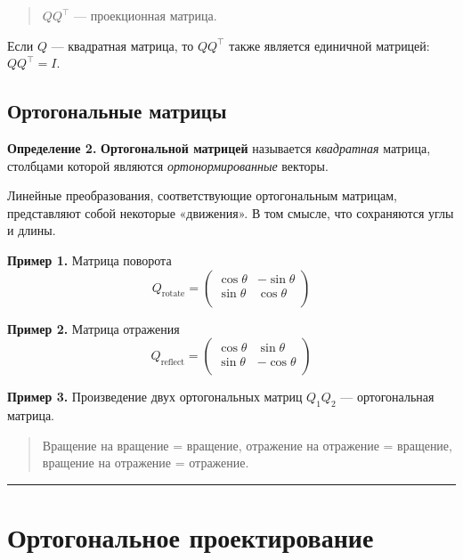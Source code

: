 \documentclass[11pt,a4paper]{article}
\begin{document}
\begin{quote}
\(QQ^\top\) --- проекционная матрица.
\end{quote}

Если \(Q\) --- квадратная матрица, то \(Q Q^\top\) также является
единичной матрицей: \(Q Q^\top = I\).

    \hypertarget{ux43eux440ux442ux43eux433ux43eux43dux430ux43bux44cux43dux44bux435-ux432ux435ux43aux442ux43eux440ux44b-ux438-ux43cux430ux442ux440ux438ux446ux44b}{%
\subsection{Ортогональные
матрицы}\label{ux43eux440ux442ux43eux433ux43eux43dux430ux43bux44cux43dux44bux435-ux432ux435ux43aux442ux43eux440ux44b-ux438-ux43cux430ux442ux440ux438ux446ux44b}}

\textbf{Определение 2.} \textbf{Ортогональной матрицей} называется
\emph{квадратная} матрица, столбцами которой являются \emph{ортонормированные}
векторы.

Линейные преобразования, соответствующие ортогональным матрицам,
представляют собой некоторые «движения». В том смысле, что сохраняются
углы и длины.

\textbf{Пример 1.} Матрица поворота \[
  Q_\mathrm{rotate} =
  \begin{pmatrix}
     \cos\theta & -\sin\theta \\
     \sin\theta &  \cos\theta \\
  \end{pmatrix}
\]

\textbf{Пример 2.} Матрица отражения \[
  Q_\mathrm{reflect} =
  \begin{pmatrix}
     \cos\theta &  \sin\theta \\
     \sin\theta & -\cos\theta \\
  \end{pmatrix}
\]

\textbf{Пример 3.} Произведение двух ортогональных матриц \(Q_1 Q_2\)
--- ортогональная матрица.

\begin{quote}
Вращение на вращение = вращение, отражение на отражение = вращение,
вращение на отражение = отражение.
\end{quote}

    \begin{center}\rule{0.5\linewidth}{0.5pt}\end{center}

    \hypertarget{ux43eux440ux442ux43eux433ux43eux43dux430ux43bux44cux43dux43eux435-ux43fux440ux43eux435ux43aux442ux438ux440ux43eux432ux430ux43dux438ux435}{%
\section{Ортогональное
проектирование}\label{ux43eux440ux442ux43eux433ux43eux43dux430ux43bux44cux43dux43eux435-ux43fux440ux43eux435ux43aux442ux438ux440ux43eux432ux430ux43dux438ux435}}
\end{document}
